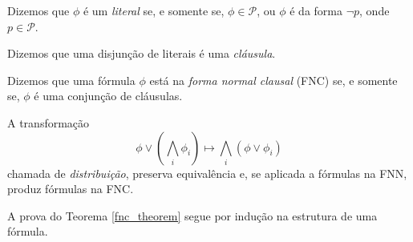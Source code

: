 \begin{definition}
	Dizemos que $\phi$ é um \emph{literal} se, e somente se, $\phi \in \mathcal{P}$, ou $\phi$ é da forma $\neg p$, onde $p \in \mathcal{P}$.
	
	Dizemos que uma disjunção de literais é uma \emph{cláusula}.
	
    Dizemos que uma fórmula $\phi$ está na \emph{forma normal clausal} (FNC) se, e somente se, $\phi$ é uma conjunção de cláusulas.
\end{definition}

\begin{theorem}
	\label{fnc_theorem}
    A transformação $$\phi \vee \left( \bigwedge_i \phi_i \right) \longmapsto \bigwedge_i \left( \phi \vee \phi_i \right)$$ chamada de \emph{distribuição}, preserva equivalência e, se aplicada a fórmulas na FNN, produz fórmulas na FNC.
\end{theorem}

A prova do Teorema \ref{fnc_theorem} segue por indução na estrutura de uma fórmula.

